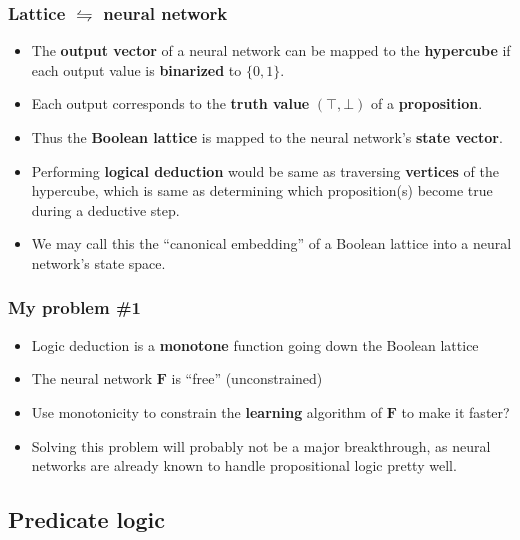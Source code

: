 \documentclass{beamer}
\newcommand{\vect}[1]{\boldsymbol{#1}}
\begin{document}
\begin{frame}
\frametitle{Lattice $\leftrightharpoons$ neural network}
\begin{itemize}
	\item The \textbf{output vector} of a neural network can be mapped to the \textbf{hypercube} if each output value is \textbf{binarized} to $\{0, 1\}$.  
	
	\item Each output corresponds to the \textbf{truth value} $(\top, \bot)$ of a \textbf{proposition}.  
	
	\item Thus the \textbf{Boolean lattice} is mapped to the neural network's \textbf{state vector}.
	
	\item Performing \textbf{logical deduction} would be same as traversing \textbf{vertices} of the hypercube, which is same as determining which proposition(s) become true during a deductive step.
	
	\item We may call this the ``canonical embedding'' of a Boolean lattice into a neural network's state space.
\end{itemize}
\end{frame}

\begin{frame}
\frametitle{My problem \#1}
\begin{itemize}
	\item Logic deduction is a \textbf{monotone} function going down the Boolean lattice
	\item The neural network $\vect{F}$ is ``free'' (unconstrained)
	\item Use monotonicity to constrain the \textbf{learning} algorithm of $\vect{F}$ to make it faster?
	\item Solving this problem will probably not be a major breakthrough, as neural networks are already known to handle propositional logic pretty well.
\end{itemize}
\end{frame}

\subsection{Predicate logic}

\frame{\subsectionpage}
\end{document}
